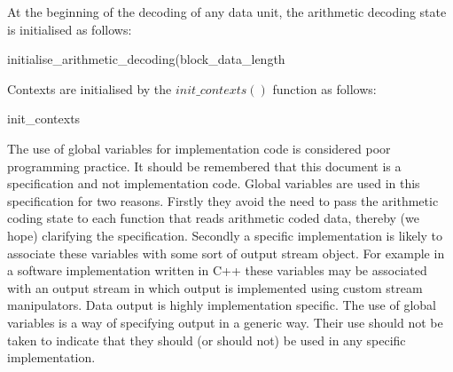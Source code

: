 \label{initarith}

At the beginning of the decoding of any data unit, the arithmetic
decoding state is initialised as follows:

\begin{pseudo}{initialise\_arithmetic\_decoding}{(block\_data\_length}
\end{pseudo}

Contexts are initialised by the $init\_contexts()$ function as follows:
\begin{pseudo}{init\_contexts}{}
\bsEND
\end{pseudo}

\begin{informative}
The use of global variables for implementation code is
considered poor programming practice. It should be remembered that this
document is a specification and not implementation code. Global
variables are used in this specification for two reasons. Firstly they
avoid the need to pass the arithmetic coding state to each function that
reads arithmetic coded data, thereby (we hope) clarifying the specification.
Secondly a specific implementation is likely to associate these
variables with some sort of output stream object. For example in a
software implementation written in C++ these variables may be associated
with an output stream in which output is implemented using custom stream
manipulators. Data output is highly implementation specific. The use of
global variables is a way of specifying output in a generic way. Their
use should not be taken to indicate that they should (or should not) be
used in any specific implementation.
\end{informative}
